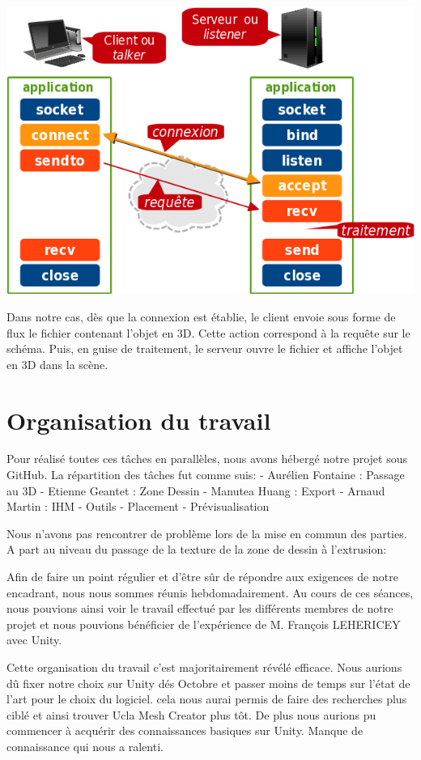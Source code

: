 \documentclass[a4paper,11pt]{article}
\begin{document}
			\centerline{\includegraphics[scale=1]{images/tcp-socket.png}}
			
			Dans notre cas, dès que la connexion est établie, le client envoie sous forme de flux le fichier contenant l'objet en 3D. Cette action correspond à la requête sur le schéma. Puis, en guise de traitement, le serveur ouvre le fichier et affiche l'objet en 3D dans la scène.
			
	\section{Organisation du travail}
				
				Pour réalisé toutes ces tâches en parallèles, nous avons hébergé notre projet sous GitHub. La répartition des tâches fut comme suis:
				- Aurélien Fontaine : Passage au 3D
				- Etienne Geantet : Zone Dessin
				- Manutea Huang : Export
				- Arnaud Martin : IHM - Outils - Placement - Prévisualisation
			
				Nous n'avons pas rencontrer de problème lors de la mise en commun des parties. A part au niveau du passage de la texture de la zone de dessin à l'extrusion:
			
				Afin de faire un point régulier et d'être sûr de répondre aux exigences de notre encadrant, nous nous sommes réunis hebdomadairement. Au cours de ces séances, nous pouvions ainsi voir le travail effectué par les différents membres de notre projet et nous pouvions bénéficier de l'expérience de M. François LEHERICEY avec Unity.
				
				Cette organisation du travail c'est majoritairement révélé efficace. Nous aurions dû fixer notre choix sur Unity dés Octobre et passer moins de temps sur l'état de l'art pour le choix du logiciel. cela nous aurai permis de faire des recherches plus ciblé et ainsi trouver Ucla Mesh Creator plus tôt. De plus nous aurions pu commencer à acquérir des connaissances basiques sur Unity. Manque de connaissance qui nous a ralenti.
			
\end{document}
